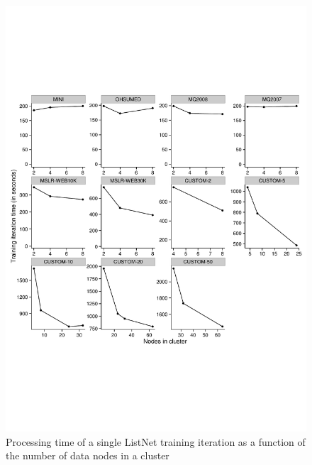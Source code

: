 \begin{figure}
\centering
\includegraphics[trim=0cm 5cm 0cm 5cm, scale=0.7]{gfx/speedup_faceted.pdf}
\caption{Processing time of a single ListNet training iteration as a function of the number of data nodes in a cluster}
\label{fig:speedup_train_time}
\end{figure}

